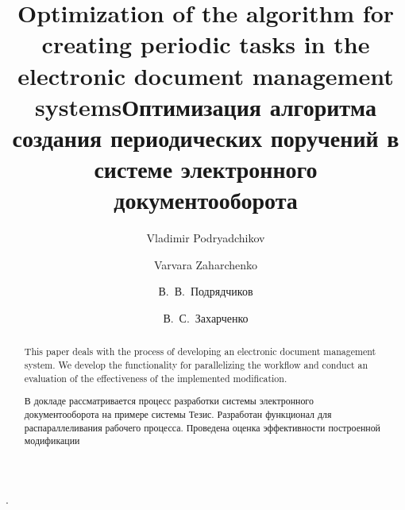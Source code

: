 \begin{englishtitle}
\title{Optimization of the algorithm for creating periodic tasks in the electronic document management systems}
\author{Vladimir Podryadchikov
\and
  Varvara Zaharchenko
}

\maketitle

\begin{abstract}
This paper deals with the process of developing an electronic document management system. We develop the functionality for parallelizing the workflow and conduct an evaluation of the effectiveness of the implemented modification.

\end{abstract}
\end{englishtitle}

\iffalse
\documentclass[12pt]{llncs}
\usepackage[T2A]{fontenc}
\usepackage[utf8]{inputenc}
\usepackage[english,russian]{babel}
\usepackage[russian]{nla}
\usepackage{multirow}




\fi

\title{Оптимизация алгоритма создания периодических поручений в системе электронного документооборота%
}
\author{В.~В.~Подрядчиков%
  \and
  В.~С.~Захарченко
} 
.

\maketitle

\begin{abstract}
В докладе рассматривается процесс разработки системы электронного документооборота на примере системы Тезис. Разработан функционал для распараллеливания рабочего процесса. Проведена оценка эффективности построенной модификации

\end{abstract}

